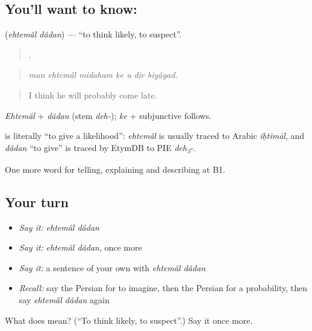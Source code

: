 \subsection*{You'll want to know:  }
\textbf{ } (\emph{ehtemâl dâdan}) — \textquotedblleft{}to think likely, to suspect\textquotedblright{}.

\begin{quote}
      .
\end{quote}

\begin{quote}
\emph{man ehtemâl midaham ke u dir biyâyad.}
\end{quote}

\begin{quote}
I think he will probably come late.
\end{quote}

\emph{Ehtemâl} + \emph{dâdan} (stem \emph{deh-}); \emph{ke} + subjunctive follows.

\begin{cousinweb}
\textbf{ } is literally \textquotedblleft{}to give a likelihood\textquotedblright{}: \emph{ehtemâl} is usually traced to Arabic \emph{iḥtimāl}, and \emph{dâdan} \textquotedblleft{}to give\textquotedblright{} is traced by EtymDB to PIE \emph{deh\textsubscript{3}-}.
\end{cousinweb}

\begin{grammarlens}[title={What you've built}]
One more word for telling, explaining and describing at B1.
\end{grammarlens}

\subsection*{Your turn}
\begin{itemize}
\raggedright
  \item \emph{Say it:} \emph{ehtemâl dâdan}
  \item \emph{Say it:} \emph{ehtemâl dâdan}, once more
  \item \emph{Say it:} a sentence of your own with \emph{ehtemâl dâdan}
  \item \emph{Recall:} say the Persian for to imagine, then the Persian for a probability, then say \emph{ehtemâl dâdan} again
\end{itemize}

\begin{tcolorbox}[breakable,colback=teal!4,colframe=teal!35!black,title={Before you move on}]
What does   mean? (\textquotedblleft{}To think likely, to suspect\textquotedblright{}.) Say it once more.
\end{tcolorbox}
